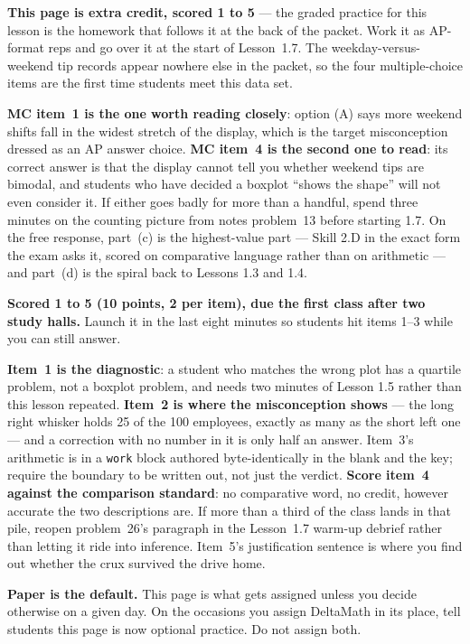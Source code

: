\documentclass[10pt]{article}
\begin{document}
\begin{teachernote}[AP Practice]
\textbf{This page is extra credit, scored 1 to 5} --- the graded practice for this lesson is the homework that
follows it at the back of the packet. Work it as AP-format reps and go over it at the start of
Lesson~1.7. The weekday-versus-weekend tip records appear nowhere else in the packet, so the four
multiple-choice items are the first time students meet this data set.

\textbf{MC item~1 is the one worth reading closely}: option (A) says more weekend shifts fall in
the widest stretch of the display, which is the target misconception dressed as an AP answer
choice. \textbf{MC item~4 is the second one to read}: its correct answer is that the display
cannot tell you whether weekend tips are bimodal, and students who have decided a boxplot ``shows
the shape'' will not even consider it. If either goes badly for more than a handful, spend three
minutes on the counting picture from notes problem~13 before starting 1.7. On the free response,
part~(c) is the highest-value part --- Skill 2.D in the exact form the exam asks it, scored on
comparative language rather than on arithmetic --- and part~(d) is the spiral back to Lessons 1.3
and 1.4.
\end{teachernote}

\begin{teachernote}[Homework]
\textbf{Scored 1 to 5 (10 points, 2 per item), due the first class after two study halls.} Launch it in
the last eight minutes so students hit items 1--3 while you can still answer.

\textbf{Item~1 is the diagnostic}: a student who matches the wrong plot has a quartile problem,
not a boxplot problem, and needs two minutes of Lesson 1.5 rather than this lesson repeated.
\textbf{Item~2 is where the misconception shows} --- the long right whisker holds 25 of the 100
employees, exactly as many as the short left one --- and a correction with no number in it is
only half an answer. Item~3's arithmetic is in a \texttt{work} block authored byte-identically in
the blank and the key; require the boundary to be written out, not just the verdict.
\textbf{Score item~4 against the comparison standard}: no comparative word, no credit, however
accurate the two descriptions are. If more than a third of the class lands in that pile, reopen
problem~26's paragraph in the Lesson~1.7 warm-up debrief rather than letting it ride into
inference. Item~5's justification sentence is where you find out whether the crux survived the
drive home.

\textbf{Paper is the default.} This page is what gets assigned unless you decide otherwise on a
given day. On the occasions you assign DeltaMath in its place, tell students this page is now optional practice. Do not assign both.
\end{teachernote}
\end{document}
